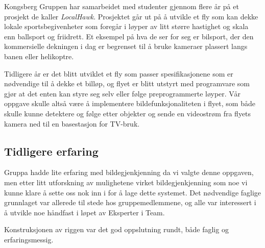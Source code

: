 Kongsberg Gruppen har samarbeidet med studenter gjennom flere år på et prosjekt de kaller \emph{LocalHawk}. Prosjektet går ut på å utvikle et fly som kan dekke lokale sportsbegivenheter som foregår i løyper av litt større hastighet og skala enn ballsport og friidrett. Et eksempel på hva de ser for seg er bilsport, der den kommersielle dekningen i dag er begrenset til å bruke kameraer plassert langs banen eller helikoptre.

Tidligere år er det blitt utviklet et fly som passer spesifikasjonene som er nødvendige til å dekke et billøp, og flyet er blitt utstyrt med programvare som gjør at det enten kan styre seg selv eller følge preprogrammerte løyper. Vår oppgave skulle altså være å implementere bildefunksjonaliteten i flyet, som både skulle kunne detektere og følge etter objekter og sende en videostrøm fra flyets kamera ned til en basestasjon for TV-bruk.

\subsection{Tidligere erfaring}

Gruppa hadde lite erfaring med bildegjenkjenning da vi valgte denne oppgaven, men etter litt utforskning av mulighetene virket bildegjenkjenning som noe vi kunne klare å sette oss nok inn i for å lage dette systemet. Det nødvendige faglige grunnlaget var allerede til stede hos gruppemedlemmene, og alle var interessert i å utvikle noe håndfast i løpet av Eksperter i Team.

Konstruksjonen av riggen var det god oppslutning rundt, både faglig og erfaringsmessig.